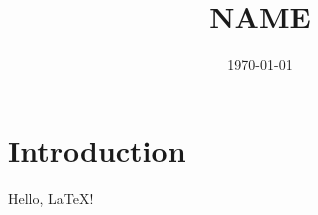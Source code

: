 \documentclass[a4paper,11pt]{article}
\title{{{NAME}}}
\author{}
\date{\today}
\begin{document}
\maketitle

\section{Introduction}

Hello, LaTeX!
\end{document}
